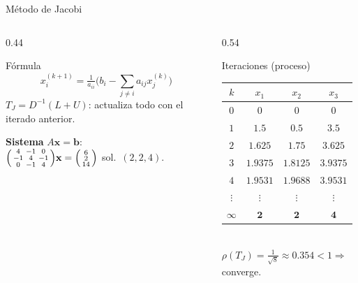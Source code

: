 \documentclass[aspectratio=169,10pt]{beamer}
\begin{document}
\begin{frame}{Método de Jacobi}
\begin{columns}[T]
\begin{column}{0.44\textwidth}
\begin{cardidea}{Fórmula}{\faSuperscript}
$$x_i^{(k+1)}=\tfrac{1}{a_{ii}}\Big(b_i-\!\!\sum_{j\neq i}\!a_{ij}x_j^{(k)}\Big)$$
{\footnotesize $T_J=D^{-1}(L+U)$: actualiza todo con el iterado anterior.}
\end{cardidea}
\vspace{1mm}
\begin{cardnota}[\faListOl]
{\footnotesize\textbf{Sistema} $A\mathbf x=\mathbf b$:\\[0.6mm]
$\begin{psmallmatrix}4&-1&0\\-1&4&-1\\0&-1&4\end{psmallmatrix}\mathbf x=\begin{psmallmatrix}6\\2\\14\end{psmallmatrix}$\; sol.\ $(2,2,4)$.}
\end{cardnota}
\end{column}
\begin{column}{0.54\textwidth}
\begin{cardgear}{Iteraciones (proceso)}{\faTable}
\centering
{\footnotesize\renewcommand{\arraystretch}{1.2}
\begin{tabular}{c|ccc}
$k$ & $x_1$ & $x_2$ & $x_3$\\\hline
$0$&$0$&$0$&$0$\\ $1$&$1.5$&$0.5$&$3.5$\\ $2$&$1.625$&$1.75$&$3.625$\\ $3$&$1.9375$&$1.8125$&$3.9375$\\ $4$&$1.9531$&$1.9688$&$3.9531$\\ $\vdots$&$\vdots$&$\vdots$&$\vdots$\\ $\infty$&$\mathbf 2$&$\mathbf 2$&$\mathbf 4$\\
\end{tabular}}\\[1mm]
{\footnotesize $\rho(T_J)=\tfrac{1}{\sqrt8}\approx0.354<1\Rightarrow$ converge.}
\end{cardgear}
\end{column}
\end{columns}
\end{frame}
\end{document}
